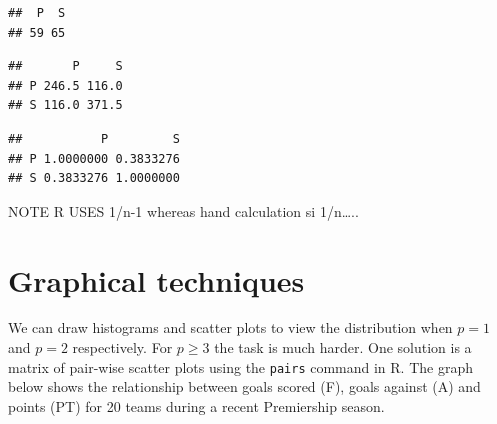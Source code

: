 \documentclass[]{book}
\newenvironment{Shaded}{\begin{snugshade}}{\end{snugshade}}
\newcommand{\KeywordTok}[1]{\textcolor[rgb]{0.13,0.29,0.53}{\textbf{#1}}}
\newcommand{\NormalTok}[1]{#1}
\newcommand{\OperatorTok}[1]{\textcolor[rgb]{0.81,0.36,0.00}{\textbf{#1}}}
\newcommand{\StringTok}[1]{\textcolor[rgb]{0.31,0.60,0.02}{#1}}
\theoremstyle{definition}
\theoremstyle{definition}
\theoremstyle{definition}
\theoremstyle{remark}
\begin{document}
\begin{verbatim}
##  P  S 
## 59 65
\end{verbatim}

\begin{Shaded}
\end{Shaded}

\begin{verbatim}
##       P     S
## P 246.5 116.0
## S 116.0 371.5
\end{verbatim}

\begin{Shaded}
\end{Shaded}

\begin{verbatim}
##           P         S
## P 1.0000000 0.3833276
## S 0.3833276 1.0000000
\end{verbatim}

NOTE R USES 1/n-1 whereas hand calculation si 1/n\ldots{}..

\hypertarget{graphical-techniques}{%
\section{Graphical techniques}\label{graphical-techniques}}

We can draw histograms and scatter plots to view the distribution when \(p=1\) and \(p=2\) respectively. For \(p \geq 3\) the task is much harder. One solution is a matrix of pair-wise scatter plots using the \texttt{pairs} command in R. The graph below shows the relationship between goals scored (F), goals against (A) and points (PT) for 20 teams during a recent Premiership season.
\end{document}
